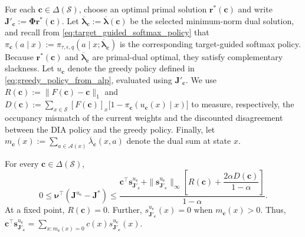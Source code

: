 \documentclass[sglanonrev]{informs4}
\providecommand{\bJ}{\boldsymbol{J}}
\providecommand{\bPhi}{\boldsymbol{\Phi}}
\providecommand{\bc}{\boldsymbol{c}}
\providecommand{\blambda}{\boldsymbol{\lambda}}
\providecommand{\bnu}{\boldsymbol{\nu}}
\providecommand{\br}{\boldsymbol{r}}
\def\edits#1{{\color{black}#1}}
\begin{document}
For each $\bc\in\Delta(\mathcal S)$, choose an optimal primal solution
$\br^*(\bc)$ and write
$\bJ'_{\bc}:=\bPhi\br^*(\bc)$. Let
$\overline{\blambda}_{\bc}:=\overline{\blambda}(\bc)$ be the selected
minimum-norm dual solution, and recall from
\eqref{eq:target_guided_softmax_policy} that
$\pi_{\bc}(a\mid x):=
\pi_{\tau,\epsilon,q}(a\mid x;\overline{\blambda}_{\bc})$ is the
corresponding target-guided softmax policy. Because $\br^*(\bc)$ and
$\overline{\blambda}_{\bc}$ are primal-dual optimal, they satisfy
complementary slackness. Let $u_{\bc}$ denote the greedy policy defined
in \eqref{eq:greedy_policy_from_alp}, evaluated using $\bJ'_{\bc}$.
We use $R(\bc):=\|F(\bc)-\bc\|_1$ 
and
$
D(\bc):=
\sum_{x\in\mathcal S}[F(\bc)]_x
\bigl[1-\pi_{\bc}(u_{\bc}(x)\mid x)\bigr]
$
to measure, respectively, the occupancy mismatch of the current weights
and the discounted disagreement between the \ac{DIA} policy and the
greedy policy. Finally, let
$m_{\bc}(x):=\sum_{a\in\mathcal A(x)}
\overline\lambda_{\bc}(x,a)$ denote the dual sum at state $x$.

\begin{corollary}
\label{cor:greedy_certificate}
For every $\bc\in\Delta(\mathcal S)$,
\begin{equation}
\label{eq:greedy_certificate}
0\le\bnu^\top(\bJ^{u_{\bc}}-\bJ^*)
\le
\frac{
\bc^\top\boldsymbol s_{\bJ'_{\bc}}^{u_{\bc}}
+
\|\boldsymbol s_{\bJ'_{\bc}}^{u_{\bc}}\|_\infty
\left[
R(\bc)
+\dfrac{2\alpha D(\bc)}{1-\alpha}
\right]}
{1-\alpha}.
\end{equation}
\edits{At a fixed point, $R(\bc)=0$. Further,
$s_{\bJ'_{\bc}}^{u_{\bc}}(x)=0 \text{ when }m_{\bc}(x)>0$.
Thus,
$\bc^\top\boldsymbol s_{\bJ'_{\bc}}^{u_{\bc}} =
\sum_{x:m_{\bc}(x)=0}
c(x)s_{\bJ'_{\bc}}^{u_{\bc}}(x).$}
\end{corollary}
\end{document}
